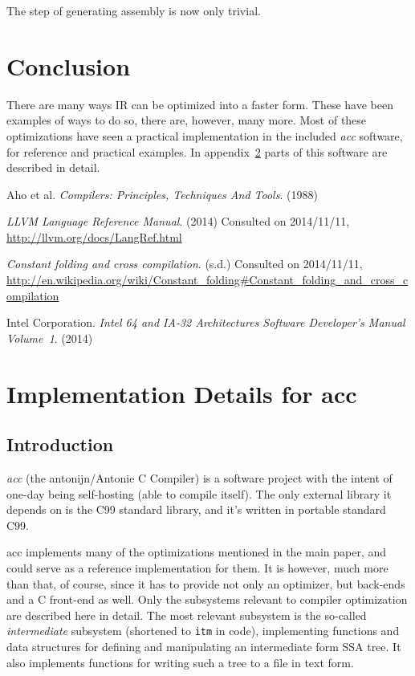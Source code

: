 \documentclass[12pt, a4paper]{article}
\begin{document}
The step of generating assembly is now only trivial.

\section{Conclusion}
There are many ways IR can be optimized into a faster form. These have been
examples of ways to do so, there are, however, many more. Most of these
optimizations have seen a practical implementation in the included \textit{acc}
software, for reference and practical examples. In appendix~\ref{sec:accdet} parts
of this software are described in detail.

\begin{thebibliography}{9}
   Aho et al.
  \emph{Compilers: Principles, Techniques And Tools}.
  (1988)

  \emph{LLVM Language Reference Manual}. (2014) Consulted on 2014/11/11,
  \url{http://llvm.org/docs/LangRef.html}

  \emph{Constant folding and cross compilation}. (s.d.) Consulted on 2014/11/11,
  \url{http://en.wikipedia.org/wiki/Constant_folding#Constant_folding_and_cross_compilation}

  Intel Corporation.
  \emph{Intel\textregistered{} 64 and IA-32 Architectures Software Developer's
Manual Volume~1}.
  (2014)

\end{thebibliography}


\newpage
\appendix
\section{Implementation Details for acc}
\label{sec:accdet}
\subsection{Introduction}
  \textit{acc} (the antonijn/Antonie C Compiler) is a software project with the intent of
one-day being self-hosting (able to compile itself). The only external library
it depends on is the C99 standard library, and it's written in portable standard C99.

  acc implements many of the optimizations mentioned in the main paper, and could
serve as a reference implementation for them. It is however, much more than that,
of course, since it has to provide not only an optimizer, but back-ends and a C
front-end as well. Only the subsystems relevant to compiler optimization are
described here in detail. The most relevant subsystem is the so-called
\textit{intermediate} subsystem (shortened to \verb+itm+ in code), implementing
functions and data structures for defining and manipulating an intermediate form
SSA tree. It also implements functions for writing such a tree to a file in text
form.
\end{document}
